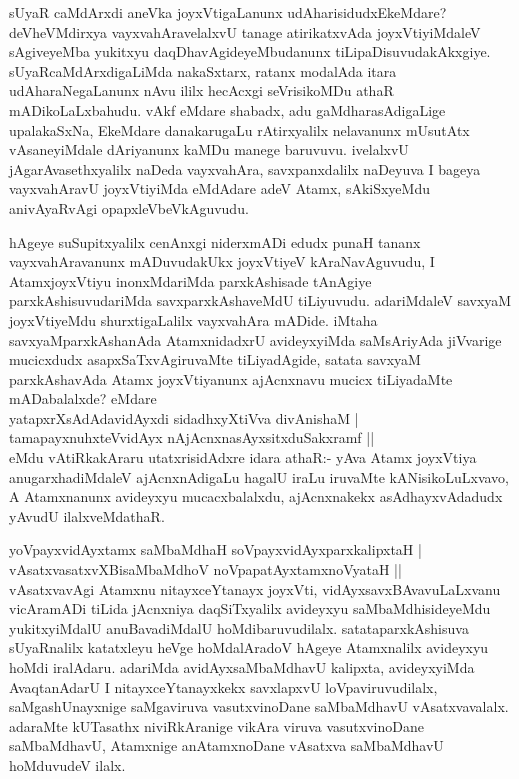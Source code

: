 \begin{artha}
sUyaR caMdArxdi aneVka joyxVtigaLanunx udAharisidudx\break EkeMdare? deVheVMdirxya vayxvahAravelalxvU tanage atirikatxvAda joyxVtiyiMdaleV sAgiveyeMba yukitxyu daqDhavAgideyeMbudanunx tiLipaDisuvudakAkxgiye. sUyaRcaMdArxdigaLiMda nakaSxtarx, ratanx modalAda itara udAharaNegaLanunx nAvu ililx hecAcxgi seVrisikoMDu athaR mADikoLaLxbahudu. vAkf eMdare shabadx, adu gaMdharasAdigaLige upalakaSxNa, EkeMdare danakarugaLu rAtirxyalilx nelavanunx mUsutAtx vAsaneyiMdale dAriyanunx kaMDu manege baruvuvu. ivelalxvU jAgarAvasethxyalilx naDeda vayxvahAra, savxpanxdalilx naDeyuva I bageya vayxvahAravU joyxVtiyiMda eMdAdare adeV Atamx, sAkiSxyeMdu anivAyaRvAgi opapxleVbeVkAguvudu.
\end{artha}

\begin{artha}
hAgeye suSupitxyalilx cenAnxgi niderxmADi edudx punaH tananx vayxvahAravanunx mADuvudakUkx joyxVtiyeV kAraNavAguvudu, I AtamxjoyxVtiyu inonxMdariMda parxkAshisade tAnAgiye parxkAshisuvudariMda savxparxkAshaveMdU tiLiyuvudu. adariMdaleV savxyaM joyxVtiyeMdu shurxtigaLalilx vayxvahAra mADide. iMtaha savxyaMparxkAshanAda AtamxnidadxrU avideyxyiMda saMsAriyAda jiVvarige mucicxdudx asapxSaTxvAgiruvaMte tiLiyadAgide, satata savxyaM parxkAshavAda Atamx joyxVtiyanunx ajAcnxnavu mucicx tiLiyadaMte mADabalalxde? eMdare \\yatapxrXsAdAdavidAyxdi sidadhxyXtiVva divAnishaM | \\
tamapayxnuhxteV\s vidAyx nAjAcnxnasAyxsitxduSakxramf || \\
eMdu vAtiRkakAraru utatxrisidAdxre idara athaR:- yAva Atamx joyxVtiya anugarxhadiMdaleV ajAcnxnAdigaLu hagalU iraLu iruvaMte kANisikoLuLxvavo, A Atamxnanunx avideyxyu mucacxbalalxdu, ajAcnxnakekx asAdhayxvAdadudx yAvudU ilalxveMdathaR.
\end{artha}


\begin{artha}
\noindent
yoV\s payxvidAyxtamx saMbaMdhaH soV\s payxvidAyxparxkalipxtaH |\\
vAsatxvasatxvXBisaMbaMdhoV noVpapatAyxtamxnoVyataH ||\\
vAsatxvavAgi Atamxnu nitayxceYtanayx joyxVti, vidAyxsavxBAvavuLaLxvanu vicAramADi tiLida jAcnxniya daqSiTxyalilx avideyxyu saMbaMdhisideyeMdu yukitxyiMdalU anuBavadiMdalU hoMdibaruvudilalx. satata\break parxkAshisuva sUyaRnalilx katatxleyu heVge hoMdalAradoV hAgeye Atamxnalilx avideyxyu hoMdi iralAdaru. adariMda avidAyx\-\break saMbaMdhavU kalipxta, avideyxyiMda AvaqtanAdarU I nitayxceYtanayxkekx savxlapxvU loVpaviruvudilalx, saMgashUnayxnige saMgaviruva vasutx\-\break vinoDane saMbaMdhavU vAsatxvavalalx. adaraMte kUTasathx niviRkAranige vikAra viruva vasutxvinoDane saMbaMdhavU, Atamxnige anAtamxnoDane vAsatxva saMbaMdhavU hoMduvudeV ilalx.
\end{artha}


